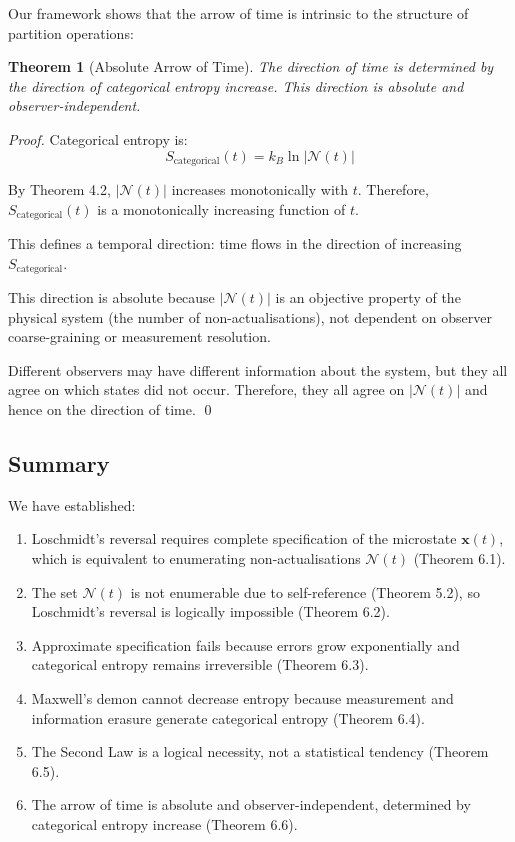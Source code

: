 \documentclass[twocolumn,10pt]{article}
\newtheorem{theorem}{Theorem}[section]
\theoremstyle{definition}
\theoremstyle{remark}
\begin{document}
Our framework shows that the arrow of time is intrinsic to the structure of partition operations:

\begin{theorem}[Absolute Arrow of Time]
The direction of time is determined by the direction of categorical entropy increase. This direction is absolute and observer-independent.
\end{theorem}

\begin{proof}
Categorical entropy is:
$$
S_{\text{categorical}}(t) = k_B \ln|\mathcal{N}(t)|
$$

By Theorem 4.2, $|\mathcal{N}(t)|$ increases monotonically with $t$. Therefore, $S_{\text{categorical}}(t)$ is a monotonically increasing function of $t$.

This defines a temporal direction: time flows in the direction of increasing $S_{\text{categorical}}$.

This direction is absolute because $|\mathcal{N}(t)|$ is an objective property of the physical system (the number of non-actualisations), not dependent on observer coarse-graining or measurement resolution.

Different observers may have different information about the system, but they all agree on which states did not occur. Therefore, they all agree on $|\mathcal{N}(t)|$ and hence on the direction of time. \qed
\end{proof}

\subsection{Summary}

We have established:

\begin{enumerate}
\item Loschmidt's reversal requires complete specification of the microstate $\mathbf{x}(t)$, which is equivalent to enumerating non-actualisations $\mathcal{N}(t)$ (Theorem 6.1).

\item The set $\mathcal{N}(t)$ is not enumerable due to self-reference (Theorem 5.2), so Loschmidt's reversal is logically impossible (Theorem 6.2).

\item Approximate specification fails because errors grow exponentially and categorical entropy remains irreversible (Theorem 6.3).

\item Maxwell's demon cannot decrease entropy because measurement and information erasure generate categorical entropy (Theorem 6.4).

\item The Second Law is a logical necessity, not a statistical tendency (Theorem 6.5).

\item The arrow of time is absolute and observer-independent, determined by categorical entropy increase (Theorem 6.6).
\end{enumerate}
\end{document}
